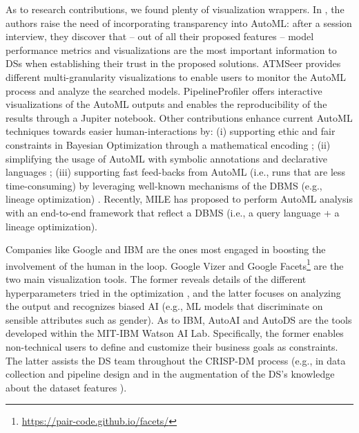 As to research contributions, we found plenty of visualization wrappers.
In \cite{drozdal2020trust}, the authors raise the need of incorporating transparency into AutoML: after a session interview, they discover that -- out of all their proposed features -- model performance metrics and visualizations are the most important information to DSs when establishing their trust in the proposed solutions.
ATMSeer \cite{wang2019atmseer} provides different multi-granularity visualizations to enable users to monitor the AutoML process and analyze the searched models.
PipelineProfiler \cite{ono2020pipelineprofiler} offers interactive visualizations of the AutoML outputs and enables the reproducibility of the results through a Jupiter notebook.
Other contributions enhance current AutoML techniques towards easier human-interactions by: (i) supporting ethic and fair constraints in Bayesian Optimization through a mathematical encoding \cite{perrone2021fair, yaghini2021human}; (ii) simplifying the usage of AutoML with symbolic annotations \cite{peng2020pyglove} and declarative languages \cite{kraska2013mlbase}; (iii) supporting fast feed-backs from AutoML (i.e., runs that are less time-consuming) by leveraging well-known mechanisms of the DBMS (e.g., lineage optimization) \cite{vartak2015supporting, xin2018accelerating}.
Recently, MILE \cite{lee2020human} has proposed to perform AutoML analysis with an end-to-end framework that reflect a DBMS (i.e., a query language + a lineage optimization).

Companies like Google and IBM are the ones most engaged in boosting the involvement of the human in the loop.
Google Vizer \cite{golovin2017google} and Google Facets\footnote{\url{https://pair-code.github.io/facets/}} are the two main visualization tools.
The former reveals details of the different hyperparameters tried in the optimization \cite{golovin2017google}, and the latter focuses on analyzing the output and recognizes biased AI (e.g., ML models that discriminate on sensible attributes such as gender).
As to IBM, AutoAI \cite{wang2020autoai} and AutoDS \cite{wang2021autods} are the tools developed within the MIT-IBM Watson AI Lab.
Specifically, the former enables non-technical users to define and customize their business goals as constraints. 
The latter assists the DS team throughout the CRISP-DM process (e.g., in data collection and pipeline design \cite{muller2019data, wang2021autods} and in the augmentation of the DS's knowledge about the dataset features \cite{drozdal2020trust}).

